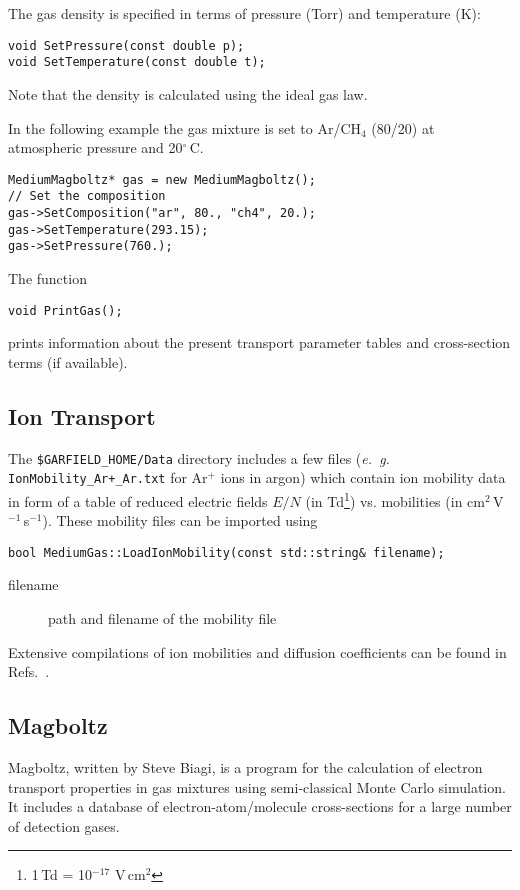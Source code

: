 The gas density is specified in terms of pressure (Torr) 
and temperature (K):
\begin{lstlisting}
void SetPressure(const double p);
void SetTemperature(const double t);
\end{lstlisting}
Note that the density is calculated using the ideal gas law. 

In the following example the gas mixture is set 
to Ar/CH\(_{4}\) (80/20) at 
atmospheric pressure and 20\(^{\circ}\)\,C.
\begin{lstlisting}
MediumMagboltz* gas = new MediumMagboltz();
// Set the composition
gas->SetComposition("ar", 80., "ch4", 20.);
gas->SetTemperature(293.15);
gas->SetPressure(760.);
\end{lstlisting}

The function
\begin{lstlisting}
void PrintGas();
\end{lstlisting}
prints information about the present transport parameter tables and 
cross-section terms (if available). 

\subsection{Ion Transport}

The \texttt{\$GARFIELD\_HOME/Data} directory includes a few files 
(\textit{e.~g.} \texttt{IonMobility\_Ar+\_Ar.txt} for Ar\(^{+}\) ions in argon) 
which contain ion mobility data in form of 
a table of reduced electric fields \(E/N\) 
(in Td\footnote{1\,Td = 10\(^{-17}\) V\,cm\(^{2}\)}) vs. 
mobilities (in cm\(^{2}\)\,V\(^{-1}\)\,s\(^{-1}\)). 
These mobility files can be imported using
\begin{lstlisting}
bool MediumGas::LoadIonMobility(const std::string& filename);
\end{lstlisting}
\begin{description}
  \item[filename] path and filename of the mobility file
\end{description}
Extensive compilations of ion mobilities and diffusion coefficients 
can be found in Refs.~\cite{Ellis1976,Ellis1978,Ellis1984,Viehland1995}. 

\subsection{Magboltz}

Magboltz, written by Steve Biagi, is a program \cite{Biagi1999} 
for the calculation of electron transport properties in gas 
mixtures using semi-classical Monte Carlo simulation. 
It includes a database of electron-atom/molecule cross-sections 
for a large number of detection gases. 

